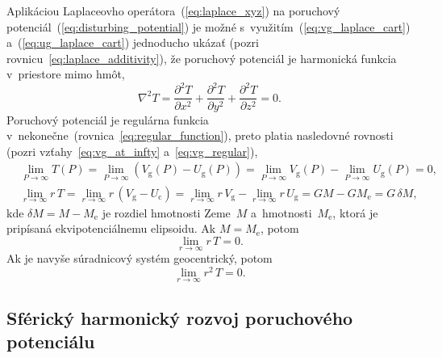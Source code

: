 \documentclass[a4paper, 12pt]{book}
\newcommand{\gidx}{\mathrm g}
\newcommand{\cidx}{\mathrm c}
\begin{document}
Aplikáciou Laplaceovho operátora~(\ref{eq:laplace_xyz}) na poruchový 
potenciál~(\ref{eq:disturbing_potential}) je možné 
s~využitím~(\ref{eq:vg_laplace_cart}) a~(\ref{eq:ug_laplace_cart}) jednoducho 
ukázať (pozri rovnicu~\ref{eq:laplace_additivity}), že poruchový potenciál je 
harmonická funkcia v~priestore mimo hmôt,
%
\begin{equation}
\label{eq:laplace_xyz_t}
\nabla^2 T = \frac{\partial^2 T}{\partial x^2} + \frac{\partial^2 T}{\partial 
y^2} + \frac{\partial^2 T}{\partial z^2} = 0{.}
\end{equation}
%
Poruchový potenciál je regulárna funkcia 
v~nekonečne~(rovnica~\ref{eq:regular_function}), preto platia nasledovné 
rovnosti (pozri vzťahy~\ref{eq:vg_at_infty} a~\ref{eq:vg_regular}),
%
\begin{align}
\label{eq:t_infty}
&\lim_{P \rightarrow \infty} T(P) = \lim_{P \rightarrow \infty} (V_\gidx(P) 
- U_\gidx(P)) = \lim_{P \rightarrow \infty} V_\gidx(P) - \lim_{P \rightarrow 
\infty} U_\gidx(P) = 0{,}\\
%
\label{eq:t_regular}
&\lim_{r \rightarrow \infty} r \, T = \lim_{r \rightarrow \infty} r \, (V_\gidx 
 - U_\cidx) = \lim_{r \rightarrow \infty} r \, V_\gidx - \lim_{r \rightarrow 
 \infty} r \, U_\gidx = GM - GM_{\mathrm{e}} = G \, \delta M{,}
\end{align}
%
kde $\delta M = M - M_\mathrm{e}$ je rozdiel hmotnosti Zeme~$M$ 
a~hmotnosti~$M_\mathrm{e}$, ktorá je pripísaná ekvipotenciálnemu elipsoidu.  Ak 
$M = M_\mathrm{e}$, potom
%
\begin{equation}
\lim_{r \rightarrow \infty} r \, T = 0{.}
\end{equation}
%
Ak je navyše súradnicový systém geocentrický, potom \parencite{Pick1973}
%
\begin{equation}
\lim_{r \rightarrow \infty} r^2 \, T = 0{.}
\end{equation}


\subsection{Sférický harmonický rozvoj poruchového potenciálu}
\end{document}
